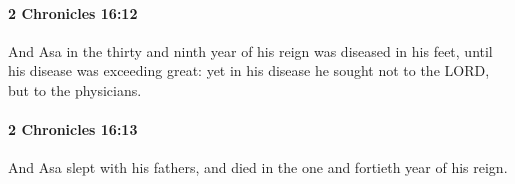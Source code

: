 		\paragraph{2 Chronicles 16:12} %
			\label{2CHRONICLES-16-12}

			And Asa in the thirty and ninth year of his reign was diseased in his feet, until his disease was exceeding great: yet in his disease he sought not to the LORD, but to the physicians.


		\paragraph{2 Chronicles 16:13} %
			\label{2CHRONICLES-16-13}

			And Asa slept with his fathers, and died in the one and fortieth year of his reign.


